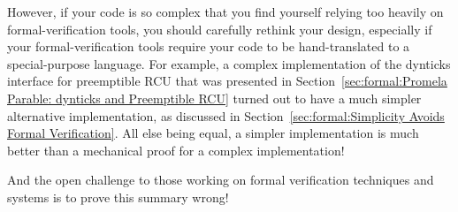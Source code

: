 However, if your code is so complex that you find yourself
relying too heavily on formal-verification
tools, you should carefully rethink your design, especially if your
formal-verification tools require your code to be hand-translated
to a special-purpose language.
For example, a complex implementation of the dynticks interface for
preemptible RCU that was presented in
Section~\ref{sec:formal:Promela Parable: dynticks and Preemptible RCU}
turned out to
have a much simpler alternative implementation, as discussed in
Section~\ref{sec:formal:Simplicity Avoids Formal Verification}.
All else being equal, a simpler implementation is much better than
a mechanical proof for a complex implementation!

And the open challenge to those working on formal verification techniques
and systems is to prove this summary wrong!
